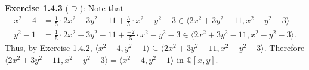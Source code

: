 \documentclass[12pt,oneside]{article}
\newenvironment{exercise}[1]{\vspace{.1in}\noindent\textbf{Exercise #1 \hspace{.05em}}}{}
\newcommand{\Q}{\mathbb{Q}}
\begin{document}
\begin{exercise}{1.4.3}
    \bigskip 
    ($\supseteq$): Note that 
    \begin{align*}
        x^2-4 &= \frac{1}{5} \cdot 2x^2+3y^2-11 + \frac{3}{5} \cdot x^2-y^2-3 \in \langle 2x^2+3y^2-11,x^2-y^2-3 \rangle \\
        y^2-1 &= \frac{1}{5} \cdot 2x^2+3y^2-11 + \frac{-2}{5} \cdot x^2-y^2-3 \in \langle 2x^2+3y^2-11,x^2-y^2-3 \rangle.
    \end{align*}
    Thus, by Exercise 1.4.2, $\langle x^2-4,y^2-1 \rangle \subseteq \langle 2x^2+3y^2-11,x^2-y^2-3 \rangle$.
    Therefore $\langle 2x^2+3y^2-11,x^2-y^2-3 \rangle = \langle x^2-4,y^2-1 \rangle$ in $\Q[x,y]$.

\end{exercise}

\end{document}
